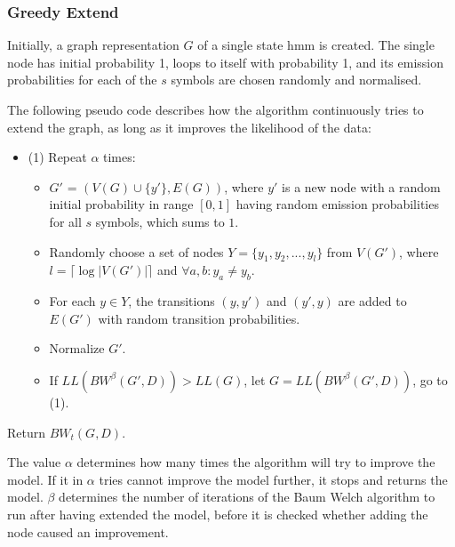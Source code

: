 \subsubsection{Greedy Extend}
Initially, a graph representation $G$ of a single state \gls{hmm} is created. The single node has initial probability 1, loops to itself with probability 1, and its emission probabilities for each of the $s$ symbols are chosen randomly and normalised.

The following pseudo code describes how the algorithm continuously tries to extend the graph, as long as it improves the likelihood of the data:

\begin{itemize}
\item (1) Repeat $\alpha$ times:
	\begin{itemize}
	\item $G'$ = $(V(G) \cup \{y'\}, E(G))$, where $y'$ is a new node with a random initial probability in range $[0, 1]$ having random emission probabilities for all $s$ symbols, which sums to $1$.
	\item Randomly choose a set of nodes $Y = \{y_1, y_2, ... , y_l\}$ from $V(G')$, where $l = \lceil \log |V(G')| \rceil$ and $\forall a,b: y_a \neq y_b$.
	\item For each $y \in Y$, the transitions $(y, y')$ and $(y', y)$ are added to $E(G')$ with random transition probabilities.
	\item Normalize $G'$.
	\item If $LL(BW^{\beta}(G', D)) > LL(G)$, let $G = LL(BW^{\beta}(G', D))$, go to (1).
	\end{itemize}
\end{itemize}

Return $BW_t(G, D)$.

The value $\alpha$ determines how many times the algorithm will try to improve the model. If it in $\alpha$ tries cannot improve the model further, it stops and returns the model.
$\beta$ determines the number of iterations of the Baum Welch algorithm to run after having extended the model, before it is checked whether adding the node caused an improvement.